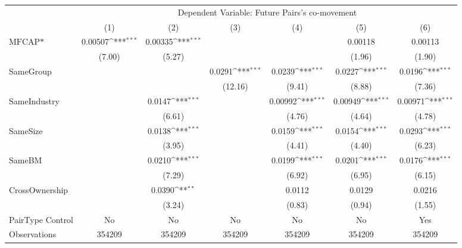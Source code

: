 {
\def\sym#1{\ifmmode^{#1}\else\(^{#1}\)\fi}
\begin{tabular}{l*{6}{c}}
\hline\hline
                &\multicolumn{6}{c}{Dependent Variable:  Future Pairs's co-movement}                                              \\\cmidrule(lr){2-7}
                &\multicolumn{1}{c}{(1)}         &\multicolumn{1}{c}{(2)}         &\multicolumn{1}{c}{(3)}         &\multicolumn{1}{c}{(4)}         &\multicolumn{1}{c}{(5)}         &\multicolumn{1}{c}{(6)}         \\
\hline
$ \text{MFCAP*} $&  0.00507\sym{***}&  0.00335\sym{***}&                  &                  &  0.00118         &  0.00113         \\
                &   (7.00)         &   (5.27)         &                  &                  &   (1.96)         &   (1.90)         \\
[1em]
SameGroup       &                  &                  &   0.0291\sym{***}&   0.0239\sym{***}&   0.0227\sym{***}&   0.0196\sym{***}\\
                &                  &                  &  (12.16)         &   (9.41)         &   (8.88)         &   (7.36)         \\
[1em]
SameIndustry    &                  &   0.0147\sym{***}&                  &  0.00992\sym{***}&  0.00949\sym{***}&  0.00971\sym{***}\\
                &                  &   (6.61)         &                  &   (4.76)         &   (4.64)         &   (4.78)         \\
[1em]
SameSize        &                  &   0.0138\sym{***}&                  &   0.0159\sym{***}&   0.0154\sym{***}&   0.0293\sym{***}\\
                &                  &   (3.95)         &                  &   (4.41)         &   (4.40)         &   (6.23)         \\
[1em]
SameBM          &                  &   0.0210\sym{***}&                  &   0.0199\sym{***}&   0.0201\sym{***}&   0.0176\sym{***}\\
                &                  &   (7.29)         &                  &   (6.92)         &   (6.95)         &   (6.15)         \\
[1em]
CrossOwnership  &                  &   0.0390\sym{**} &                  &   0.0112         &   0.0129         &   0.0216         \\
                &                  &   (3.24)         &                  &   (0.83)         &   (0.94)         &   (1.55)         \\
\hline
PairType Control&       No         &       No         &       No         &       No         &       No         &      Yes         \\
Observations    &   354209         &   354209         &   354209         &   354209         &   354209         &   354209         \\
\hline\hline  \end{tabular}}
